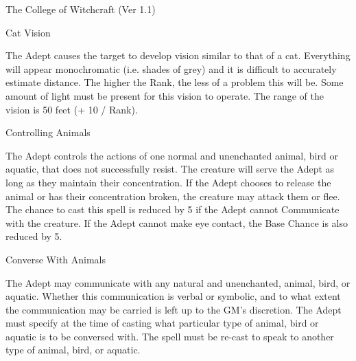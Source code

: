 \begin{Chapter}{The College of Witchcraft (Ver 1.1)}
\begin{spell}[S-5]{Cat Vision}

\begin{effects}
The Adept causes the target to develop vision similar to that of a
cat.  Everything will appear monochromatic (i.e.  shades of grey) and
it is difficult to accurately estimate distance.  The higher the Rank,
the less of a problem this will be.  Some amount of light must be
present for this vision to operate. The range of the vision is 50 feet
(+ 10 / Rank).
\end{effects}
\end{spell}

\begin{spell}[S-6]{Controlling Animals}

\begin{effects}
The Adept controls the actions of one normal and unenchanted animal,
bird or aquatic, that does not successfully resist.  The creature will
serve the Adept as long as they maintain their concentration.  If the
Adept chooses to release the animal or has their concentration broken,
the creature may attack them or flee.  The chance to cast this spell
is reduced by 5 if the Adept cannot Communicate with the creature.  If
the Adept cannot make eye contact, the Base Chance is also reduced by
5.
\end{effects}
\end{spell}

\begin{spell}[S-7]{Converse With Animals}

\begin{effects}
The Adept may communicate with any natural and unenchanted, animal,
bird, or aquatic.  Whether this communication is verbal or symbolic,
and to what extent the communication may be carried is left up to the
GM’s discretion. The Adept must specify at the time of casting what
particular type of animal, bird or aquatic is to be conversed
with. The spell must be re-cast to speak to another type of animal,
bird, or aquatic.
\end{effects}
\end{spell}


\end{Chapter}
